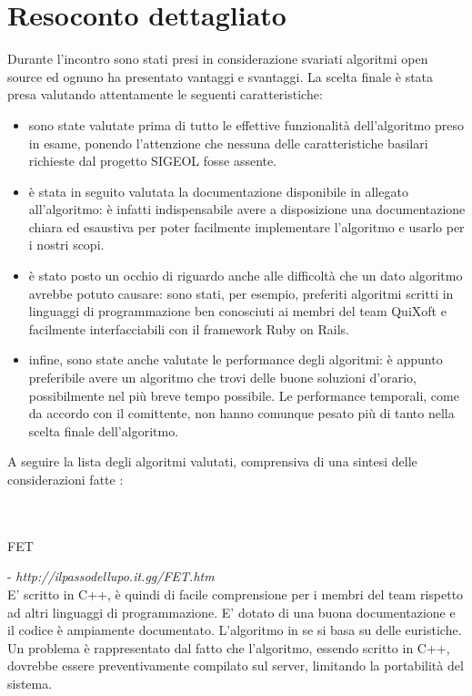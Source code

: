\documentclass[11pt,a4paper]{article}
\begin{document}
\section{Resoconto dettagliato}
Durante l'incontro sono stati presi in considerazione svariati algoritmi open source ed ognuno ha presentato vantaggi e svantaggi.
La scelta finale è stata presa valutando attentamente le seguenti caratteristiche:
\begin{itemize}
 \item sono state valutate prima di tutto le effettive funzionalità dell'algoritmo preso in esame, ponendo l'attenzione che nessuna delle caratteristiche basilari richieste dal progetto SIGEOL fosse assente.
 \item è stata in seguito valutata la documentazione disponibile in allegato all'algoritmo: è infatti indispensabile avere a disposizione una documentazione chiara ed esaustiva per poter facilmente implementare l'algoritmo e usarlo per i nostri scopi.
 \item è stato posto un occhio di riguardo anche alle difficoltà che un dato algoritmo avrebbe potuto causare: sono stati, per esempio, preferiti algoritmi scritti in linguaggi di programmazione ben conosciuti ai membri del team QuiXoft e facilmente interfacciabili con il framework Ruby on Rails.
 \item infine, sono state anche valutate le performance degli algoritmi: è appunto preferibile avere un algoritmo che trovi delle buone soluzioni d'orario, possibilmente nel più breve tempo possibile. Le performance temporali, come da accordo con il comittente, non hanno comunque pesato più di tanto nella scelta finale dell'algoritmo.
\end{itemize}
A seguire la lista degli algoritmi valutati, comprensiva di una sintesi delle considerazioni fatte :
\\ \\ \\
\begin{LARGE}FET\end{LARGE} - \textit{http://ilpassodellupo.it.gg/FET.htm}
\\
E' scritto in C++, è quindi di facile comprensione per i membri del team rispetto ad altri linguaggi di programmazione. E' dotato di una buona documentazione e il codice è ampiamente documentato. L'algoritmo in se si basa su delle euristiche. Un problema è rappresentato dal fatto che l'algoritmo, essendo scritto in C++, dovrebbe essere preventivamente compilato sul server, limitando la portabilità del sistema.
\end{document}
